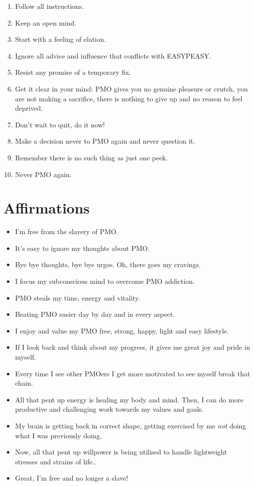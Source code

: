 \documentclass[easypeasy.tex]{subfiles}
\begin{document}
\begin{enumerate}
\item Follow all instructions.
\item Keep an open mind.
\item Start with a feeling of elation.
\item Ignore all advice and influence that conflicts with EASYPEASY.
\item Resist any promise of a temporary fix.
\item Get it clear in your mind: PMO gives you no genuine pleasure or crutch, you are not making a sacrifice, there is nothing to give up and no reason to feel deprived.
\item Don't wait to quit, do it now!
\item Make a decision never to PMO again and never question it.
\item Remember there is no such thing as just one peek.
\item Never PMO again.
\end{enumerate}

\section{Affirmations}

\begin{itemize}
\item I'm free from the slavery of PMO.
\item It's easy to ignore my thoughts about PMO.
\item Bye bye thoughts, bye bye urges. Oh, there goes my cravings.
\item I focus my subconscious mind to overcome PMO addiction.
\item PMO steals my time, energy and vitality.
\item Beating PMO easier day by day and in every aspect.
\item I enjoy and value my PMO free, strong, happy, light and easy lifestyle.
\item If I look back and think about my progress, it gives me great joy and pride in myself.
\item Every time I see other PMOers I get more motivated to see myself break that chain.
\item All that pent up energy is healing my body and mind. Then, I can do more productive and challenging work towards my values and goals.
\item My brain is getting back in correct shape, getting exercised by me \textit{not} doing what I was previously doing.
\item Now, all that pent up willpower is being utilised to handle lightweight stresses and strains of life..
\item Great, I'm free and no longer a slave!
\end{itemize}
\end{document}
